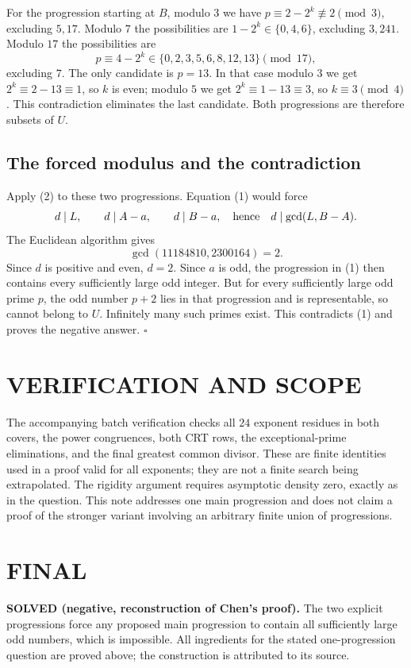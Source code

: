 For the progression starting at $B$, modulo $3$ we have
$p\equiv2-2^k\not\equiv2\pmod3$, excluding $5,17$. Modulo $7$ the possibilities are $1-2^k\in\{0,4,6\}$, excluding $3,241$. Modulo $17$ the possibilities are
\[
 p\equiv4-2^k\in\{0,2,3,5,6,8,12,13\}\pmod{17},
\]
excluding $7$. The only candidate is $p=13$. In that case modulo $3$ we get $2^k\equiv2-13\equiv1$, so $k$ is even; modulo $5$ we get $2^k\equiv1-13\equiv3$, so $k\equiv3\pmod4$. This contradiction eliminates the last candidate. Both progressions are therefore subsets of $U$.

\subsection{The forced modulus and the contradiction}
Apply (2) to these two progressions. Equation (1) would force
\[
 d\mid L,\qquad d\mid A-a,\qquad d\mid B-a,
 \quad\hbox{hence}\quad d\mid\gcd(L,B-A).
\]
The Euclidean algorithm gives
\[
 \gcd(11184810,2300164)=2.
\]
Since $d$ is positive and even, $d=2$. Since $a$ is odd, the progression in (1) then contains every sufficiently large odd integer. But for every sufficiently large odd prime $p$, the odd number $p+2$ lies in that progression and is representable, so cannot belong to $U$. Infinitely many such primes exist. This contradicts (1) and proves the negative answer. \hfill$\square$

\section{VERIFICATION AND SCOPE}
The accompanying batch verification checks all $24$ exponent residues in both covers, the power congruences, both CRT rows, the exceptional-prime eliminations, and the final greatest common divisor. These are finite identities used in a proof valid for all exponents; they are not a finite search being extrapolated. The rigidity argument requires asymptotic density zero, exactly as in the question. This note addresses one main progression and does not claim a proof of the stronger variant involving an arbitrary finite union of progressions.

\section{FINAL}
\textbf{SOLVED (negative, reconstruction of Chen's proof).} The two explicit progressions force any proposed main progression to contain all sufficiently large odd numbers, which is impossible. All ingredients for the stated one-progression question are proved above; the construction is attributed to its source.

